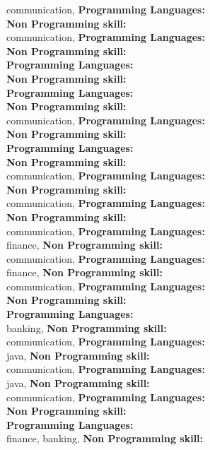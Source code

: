 communication, \textbf{Programming Languages:} \\
\textbf{Non Programming skill:} \\
communication, \textbf{Programming Languages:} \\
\textbf{Non Programming skill:} \\
\textbf{Programming Languages:} \\
\textbf{Non Programming skill:} \\
\textbf{Programming Languages:} \\
\textbf{Non Programming skill:} \\
communication, \textbf{Programming Languages:} \\
\textbf{Non Programming skill:} \\
\textbf{Programming Languages:} \\
\textbf{Non Programming skill:} \\
communication, \textbf{Programming Languages:} \\
\textbf{Non Programming skill:} \\
communication, \textbf{Programming Languages:} \\
\textbf{Non Programming skill:} \\
communication, \textbf{Programming Languages:} \\
finance, \textbf{Non Programming skill:} \\
communication, \textbf{Programming Languages:} \\
finance, \textbf{Non Programming skill:} \\
communication, \textbf{Programming Languages:} \\
\textbf{Non Programming skill:} \\
\textbf{Programming Languages:} \\
banking, \textbf{Non Programming skill:} \\
communication, \textbf{Programming Languages:} \\
java, \textbf{Non Programming skill:} \\
communication, \textbf{Programming Languages:} \\
java, \textbf{Non Programming skill:} \\
communication, \textbf{Programming Languages:} \\
\textbf{Non Programming skill:} \\
\textbf{Programming Languages:} \\
finance, banking, \textbf{Non Programming skill:} \\
